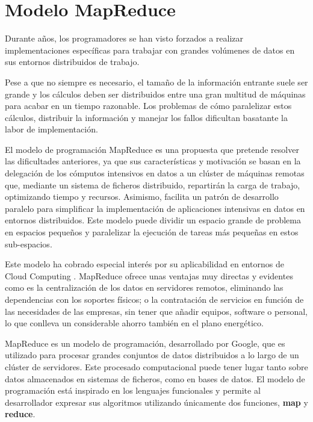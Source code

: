 \documentclass[runningheads]{llncs}
\begin{document}
\section{Modelo MapReduce}
\label{sec:mapreduce}

Durante años, los programadores se han visto forzados a realizar implementaciones específicas para trabajar con grandes 
volúmenes de datos en sus entornos distribuidos de trabajo.

Pese a que no siempre es necesario, el tamaño de la información entrante suele ser grande y los cálculos deben ser distribuidos 
entre una gran multitud de máquinas para acabar en un tiempo razonable. Los problemas de cómo paralelizar estos cálculos, 
distribuir la información y manejar los fallos dificultan basatante la labor de implementación. 

El modelo de programación MapReduce es una propuesta que pretende resolver las dificultades anteriores, ya que sus características 
y motivación se basan en la delegación de los cómputos intensivos en datos a un clúster de máquinas remotas que,
mediante un sistema de ficheros distribuido, repartirán la carga de trabajo, optimizando tiempo y recursos. 
Asimismo, facilita un patrón de desarrollo paralelo para simplificar la implementación de aplicaciones intensivas en 
datos en entornos distribuidos. Este modelo puede dividir un espacio grande de problema en espacios pequeños y paralelizar 
la ejecución de tareas más pequeñas en estos sub-espacios. 

Este modelo ha cobrado especial interés por su aplicabilidad en entornos de Cloud Computing \cite{Web08}. 
MapReduce ofrece unas ventajas muy directas y evidentes como es la centralización de los datos en servidores remotos, 
eliminando las dependencias con los soportes físicos; o la contratación de servicios en función de las
necesidades de las empresas, sin tener que añadir equipos, software o personal, lo que conlleva un considerable ahorro 
también en el plano energético. 


MapReduce \cite{Dea08} es un modelo de programación, desarrollado por Google, que es utilizado para procesar grandes conjuntos de 
datos distribuidos a lo largo de un clúster de servidores. Este procesado computacional puede tener lugar tanto sobre datos
almacenados en sistemas de ficheros, como en bases de datos. El modelo de programación está inspirado en los lenguajes funcionales 
y permite al desarrollador expresar sus algoritmos utilizando únicamente dos funciones, \textbf{map} y \textbf{reduce}. 
\end{document}
